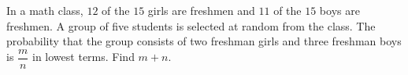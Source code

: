 In a math class, $12$ of the $15$ girls are freshmen and $11$ of the $15$ boys are freshmen. A group of five students is selected at random from the class. The probability that the group consists of two freshman girls and three freshman boys is $\dfrac {m}{n}$ in lowest terms. Find $m+n$.
